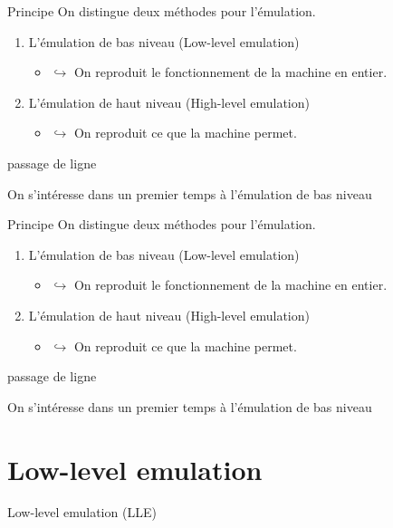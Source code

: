\documentclass{beamer}
\begin{document}
    \begin{frame}{Principe}
        On distingue deux méthodes pour l'émulation.
        \begin{enumerate}
            \item L'émulation de bas niveau (Low-level emulation)
            \begin{itemize}
                \item[\color{white}] $\hookrightarrow$ On reproduit le fonctionnement de la machine en entier.
            \end{itemize}
            \item L'émulation de haut niveau (High-level emulation)
            \begin{itemize}
                \item[\color{white}] $\hookrightarrow$ On reproduit ce que la machine permet.
            \end{itemize}
        \end{enumerate}
        {\color{white} passage de ligne}
        
        \color{white} On s'intéresse dans un premier temps à l'émulation de bas niveau
    \end{frame}

    \begin{frame}{Principe}
        On distingue deux méthodes pour l'émulation.
        \begin{enumerate}
            \item L'émulation de bas niveau (Low-level emulation)
            \begin{itemize}
                \item[\color{white}] $\hookrightarrow$ On reproduit le fonctionnement de la machine en entier.
            \end{itemize}
            \item L'émulation de haut niveau (High-level emulation)
            \begin{itemize}
                \item[\color{white}] $\hookrightarrow$ On reproduit ce que la machine permet.
            \end{itemize}
        \end{enumerate}
        {\color{white} passage de ligne}
        
        On s'intéresse dans un premier temps à l'émulation de bas niveau
    \end{frame}

    \section{Low-level emulation}    
    \begin{frame}{Low-level emulation (LLE)}
    \end{frame}
\end{document}
